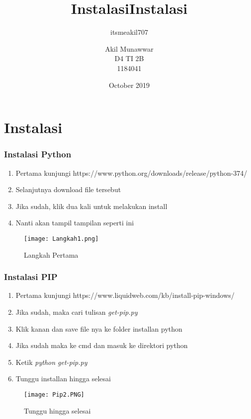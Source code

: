 \documentclass{article}
\title{Instalasi}
\author{itsmeakil707 }
\date{October 2019}
\begin{document}
\title{Instalasi}
\author{Akil Munawwar \\ D4 TI 2B \\ 1184041}
\maketitle

\part{Instalasi}
\section{Instalasi Python}
\begin{enumerate}
    \item Pertama kunjungi https://www.python.org/downloads/release/python-374/
    \item Selanjutnya download file tersebut
    \item Jika sudah, klik dua kali untuk melakukan install
    \item Nanti akan tampil tampilan seperti ini
\end{enumerate}
\begin{figure}[!htbp]
	\centering
		\texttt{[image: Langkah1.png]}
	\caption{Langkah Pertama}
\end{figure}

\newpage
\section{Instalasi PIP}
\begin{enumerate}
    \item Pertama kunjungi https://www.liquidweb.com/kb/install-pip-windows/
    \item Jika sudah, maka cari tulisan \textit{get-pip.py}
    \item Klik kanan dan save file nya ke folder installan python
    \item Jika sudah maka ke cmd dan masuk ke direktori python
    \item Ketik \textit{python get-pip.py}
    \item Tunggu installan hingga selesai
\end{enumerate}
\begin{figure}[!htbp]
	\centering
	\texttt{[image: Pip2.PNG]}
	\caption{Tunggu hingga selesai}
\end{figure}
\end{document}
